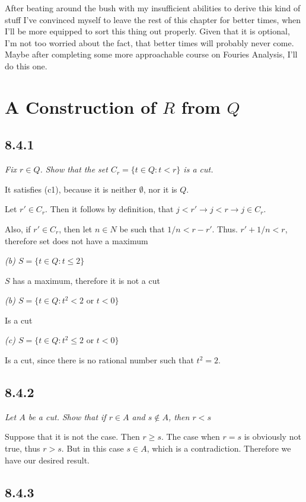 \documentclass[11pt,oneside,titlepage]{book}
\begin{document}
After beating around the bush with my insufficient abilities to derive this kind of stuff
I've convinced myself to leave the rest of this chapter for better times, when I'll be
more equipped to sort this thing out properly. Given that it is optional, I'm not too worried
about the fact, that better times will probably never come. Maybe after completing some
more approachable course on Fouries Analysis, I'll do this one.

\section{A Construction of $R$ from $Q$}

\subsection*{8.4.1}
\textit{Fix $r \in Q$. Show that the set $C_r = \{t \in Q: t < r\}$ is a cut. }

It satisfies (c1), because it is neither $\emptyset$, nor it is $Q$.

Let $r' \in C_r$. Then it follows by definition, that $j < r' \to j < r \to j \in C_r$.

Also, if $r' \in C_r$, then let $n \in N$ be such that $1/n < r - r'$. Thus. $r' + 1/n < r$,
therefore set does not have a maximum

\textit{(b) $S = \{t \in Q: t \leq 2\}$}

$S$ has a maximum, therefore it is not a cut

\textit{(b) $S = \{t \in Q: t^2 < 2 \text{ or } t < 0\}$}

Is a cut

\textit{(c) $S = \{t \in Q: t^2 \leq 2 \text{ or } t < 0\}$}

Is a cut, since there is no rational number such that $t^2 = 2$.

\subsection*{8.4.2}

\textit{Let $A$ be a cut. Show that if $r \in A$ and $s \notin A$, then $r < s$}

Suppose that it is not the case. Then $r \geq s$. The case when $r = s$ is obviously not
true, thus $r > s$. But in this case $s \in A$, which is a contradiction. Therefore we
have our desired result.

\subsection*{8.4.3}
\end{document}

